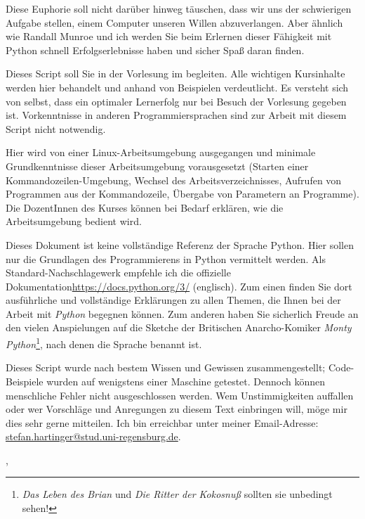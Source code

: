 Diese Euphorie soll nicht darüber hinweg täuschen, dass wir uns der schwierigen Aufgabe stellen, einem Computer unseren Willen abzuverlangen. Aber ähnlich wie Randall Munroe und ich werden Sie beim Erlernen dieser Fähigkeit mit Python schnell Erfolgserlebnisse haben und sicher Spaß daran finden.

Dieses Script soll Sie in der Vorlesung \emph{\myTitle} im \currentPeriod begleiten. Alle wichtigen Kursinhalte werden hier behandelt und anhand von Beispielen verdeutlicht. Es versteht sich von selbst, dass ein optimaler Lernerfolg nur bei Besuch der Vorlesung gegeben ist. Vorkenntnisse in anderen Programmiersprachen sind zur Arbeit mit diesem Script nicht notwendig.

Hier wird von einer Linux-Arbeits\-umgebung ausgegangen und minimale Grundkenntnisse dieser Arbeits\-umgebung vorausgesetzt (Starten einer Kommandozeilen-Umgebung, Wechsel des Arbeitsverzeichnisses, Aufrufen von Programmen aus der Kommandozeile, Übergabe von Parametern an Programme). Die DozentInnen des Kurses können bei Bedarf erklären, wie die Arbeitsumgebung bedient wird.

Dieses Dokument ist keine vollständige Referenz der Sprache Python. Hier sollen nur die Grundlagen des Programmierens in Python vermittelt werden. Als Standard-Nachschlagewerk empfehle ich die offizielle Dokumentation\url{https://docs.python.org/3/} (englisch). Zum einen finden Sie dort ausführliche und vollständige Erklärungen zu allen Themen, die Ihnen bei der Arbeit mit \emph{Python} begegnen können. Zum anderen haben Sie sicherlich Freude an den vielen Anspielungen auf die Sketche der Britischen Anarcho-Komiker \emph{Monty Python}\footnote{\emph{Das Leben des Brian} und \emph{Die Ritter der Kokosnuß}\footnotemark \;
sollten sie unbedingt sehen!}, nach denen die Sprache benannt ist.

Dieses Script wurde nach bestem Wissen und Gewissen zusammengestellt; Code-Beispiele wurden auf wenigstens einer Maschine getestet. Dennoch können menschliche Fehler nicht ausgeschlossen werden. Wem Unstimmigkeiten auffallen oder wer Vorschläge und Anregungen zu diesem Text einbringen will, möge mir dies sehr gerne mitteilen. Ich bin erreichbar unter meiner Email-Adresse:\\ \url{stefan.hartinger@stud.uni-regensburg.de}.
\begin{flushright}
\myName, \myVersionTime
\end{flushright}